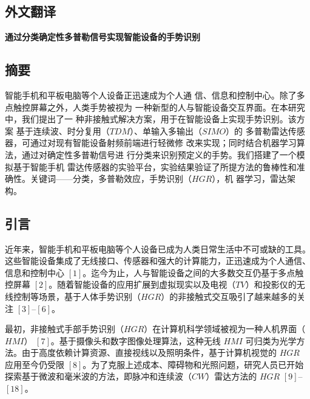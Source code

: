 \cleardoublepage
\begin{TranslationNoMiniToc}

\section{外文翻译}

{\centering{}\bfseries 通过分类确定性多普勒信号实现智能设备的手势识别\par}
\vspace{6pt}

\renewcommand{\theequation}{\arabic{equation}}
\renewcommand{\thefigure}{\arabic{figure}}

\subsection{摘要}
智能手机和平板电脑等个人设备正迅速成为个人通
信、信息和控制中心。除了多点触控屏幕之外，人类手势被视为
一种新型的人与智能设备交互界面。在本研究中，我们提出了一
种非接触式解决方案，用于在智能设备上实现手势识别。该方案
基于连续波、时分复用（$TDM$）、单输入多输出（$SIMO$）的
多普勒雷达传感器，可通过对现有智能设备射频前端进行轻微修
改来实现；同时结合机器学习算法，通过对确定性多普勒信号进
行分类来识别预定义的手势。我们搭建了一个模拟基于智能手机
雷达传感器的实验平台，实验结果验证了所提方法的鲁棒性和准
确性。关键词——分类，多普勒效应，手势识别（$HGR$），机
器学习，雷达架构。

\subsection{引言}
近年来，智能手机和平板电脑等个人设备已成为人类日常生活中不可或缺的工具。这些智能设备集成了无线接口、传感器和强大的计算能力，正迅速成为个人通信、信息和控制中心 $[1]$。迄今为止，人与智能设备之间的大多数交互仍基于多点触控屏幕 $[2]$。随着智能设备的应用扩展到虚拟现实以及电视（$TV$）和投影仪的无线控制等场景，基于人体手势识别（$HGR$）的非接触式交互吸引了越来越多的关注 $[3]$–$[6]$。

最初，非接触式手部手势识别（$HGR$）在计算机科学领域被视为一种人机界面（$HMI$） $[7]$。基于摄像头和数字图像处理算法，这种无线 $HMI$ 可归类为光学方法。由于高度依赖计算资源、直接视线以及照明条件，基于计算机视觉的 $HGR$ 应用至今仍受限 $[8]$。为了克服上述成本、障碍物和光照问题，研究人员已开始探索基于微波和毫米波的方法，即脉冲和连续波（$CW$）雷达方法的 $HGR$ $[9]$–$[18]$。


\end{TranslationNoMiniToc}
